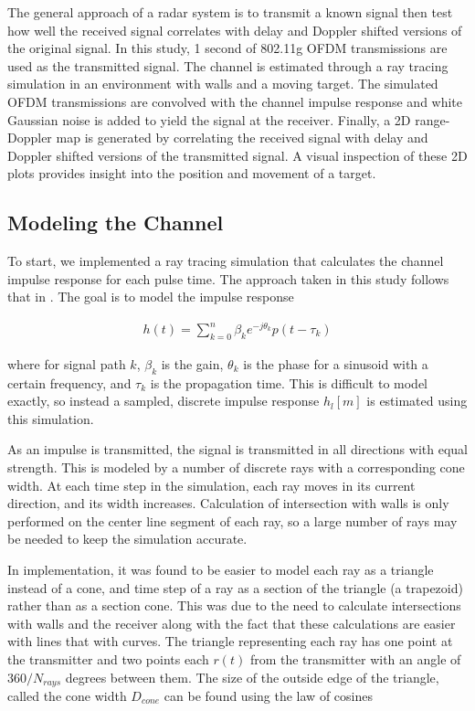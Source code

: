 \documentclass[article,11pt,onecolumn,final]{IEEEtran}
\begin{document}
The general approach of a radar system is to transmit a known signal then test how well the received signal correlates with delay and Doppler shifted versions of the original signal. In this study, 1 second of 802.11g OFDM transmissions are used as the transmitted signal. The channel is estimated through a ray tracing simulation in an environment with walls and a moving target. The simulated OFDM transmissions are convolved with the channel impulse response and white Gaussian noise is added to yield the signal at the receiver. Finally, a 2D range-Doppler map is generated by correlating the received signal with delay and Doppler shifted versions of the transmitted signal. A visual inspection of these 2D plots provides insight into the position and movement of a target.

\subsection{Modeling the Channel}

To start, we implemented a ray tracing simulation that calculates the channel impulse response for each pulse time. The approach taken in this study follows that in \cite{Holt}. The goal is to model the impulse response

\begin{align*}
 h(t) = \sum_{k=0}^{n} \beta_k e^{-j \theta_k} p(t - \tau_k) 
\end{align*}

where for signal path $k$, $\beta_k$ is the gain, $\theta_k$ is the phase for a sinusoid with a certain frequency, and $\tau_k$ is the propagation time. This is difficult to model exactly, so instead a sampled, discrete impulse response $h_l[m]$ is estimated using this simulation. 

As an impulse is transmitted, the signal is transmitted in all directions with equal strength. This is modeled by a number of discrete rays with a corresponding cone width. At each time step in the simulation, each ray moves in its current direction, and its width increases. Calculation of intersection with walls is only performed on the center line segment of each ray, so a large number of rays may be needed to keep the simulation accurate. 

In implementation, it was found to be easier to model each ray as a triangle instead of a cone, and time step of a ray as a section of the triangle (a trapezoid) rather than as a section cone. This was due to the need to calculate intersections with walls and the receiver along with the fact that these calculations are easier with lines that with curves. The triangle representing each ray has one point at the transmitter and two points each $r(t)$ from the transmitter with an angle of $360/N_{rays}$ degrees between them. The size of the outside edge of the triangle, called the cone width $D_{cone}$ can be found using the law of cosines
\end{document}
